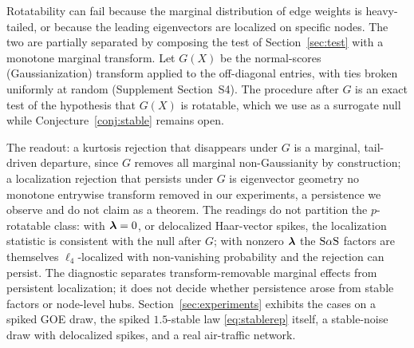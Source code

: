 Rotatability can fail because the marginal distribution of edge weights is
heavy-tailed, or because the leading eigenvectors are localized on
specific nodes. The two are partially separated by composing the test of
Section~\ref{sec:test} with a monotone marginal transform. Let $G(X)$ be
the normal-scores (Gaussianization) transform applied to the off-diagonal
entries, with ties broken uniformly at random
(Supplement Section~S4). The procedure after $G$ is an exact test of the
hypothesis that $G(X)$ is rotatable, which we use as a surrogate null
while Conjecture~\ref{conj:stable} remains open.

The readout: a kurtosis rejection that disappears under $G$ is a
marginal, tail-driven departure, since $G$ removes all marginal
non-Gaussianity by construction; a localization rejection that
persists under $G$ is eigenvector geometry no monotone entrywise
transform removed in our experiments, a persistence we observe and do
not claim as a theorem. The readings do not partition the $p$-rotatable class: with
$\bm{\lambda}=0$, or delocalized Haar-vector spikes, the localization
statistic is consistent with the null after $G$; with nonzero $\bm{\lambda}$
the $\mathrm{S}\alpha\mathrm{S}$ factors are themselves $\ell_4$-localized with
non-vanishing probability and the rejection can persist. The
diagnostic separates transform-removable marginal effects from
persistent localization; it does not decide whether persistence arose
from stable factors or node-level hubs.
Section~\ref{sec:experiments} exhibits the cases on a spiked GOE draw, the
spiked $1.5$-stable law \eqref{eq:stablerep} itself, a stable-noise draw
with delocalized spikes, and a real air-traffic network.
